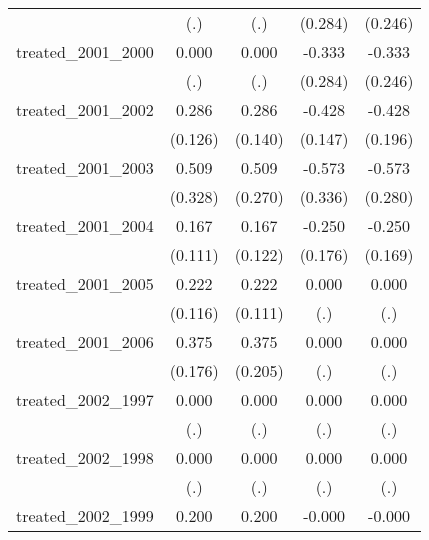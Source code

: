 {\begin{tabular}{l*{4}{c}}
            &         (.)         &         (.)         &     (0.284)         &     (0.246)         \\
[1em]
treated\_2001\_2000&       0.000         &       0.000         &      -0.333         &      -0.333         \\
            &         (.)         &         (.)         &     (0.284)         &     (0.246)         \\
[1em]
treated\_2001\_2002&       0.286\sym{*}  &       0.286\sym{*}  &      -0.428\sym{**} &      -0.428\sym{*}  \\
            &     (0.126)         &     (0.140)         &     (0.147)         &     (0.196)         \\
[1em]
treated\_2001\_2003&       0.509         &       0.509         &      -0.573         &      -0.573\sym{*}  \\
            &     (0.328)         &     (0.270)         &     (0.336)         &     (0.280)         \\
[1em]
treated\_2001\_2004&       0.167         &       0.167         &      -0.250         &      -0.250         \\
            &     (0.111)         &     (0.122)         &     (0.176)         &     (0.169)         \\
[1em]
treated\_2001\_2005&       0.222         &       0.222\sym{*}  &       0.000         &       0.000         \\
            &     (0.116)         &     (0.111)         &         (.)         &         (.)         \\
[1em]
treated\_2001\_2006&       0.375\sym{*}  &       0.375         &       0.000         &       0.000         \\
            &     (0.176)         &     (0.205)         &         (.)         &         (.)         \\
[1em]
treated\_2002\_1997&       0.000         &       0.000         &       0.000         &       0.000         \\
            &         (.)         &         (.)         &         (.)         &         (.)         \\
[1em]
treated\_2002\_1998&       0.000         &       0.000         &       0.000         &       0.000         \\
            &         (.)         &         (.)         &         (.)         &         (.)         \\
[1em]
treated\_2002\_1999&       0.200         &       0.200         &      -0.000         &      -0.000         \\

\end{tabular}}
